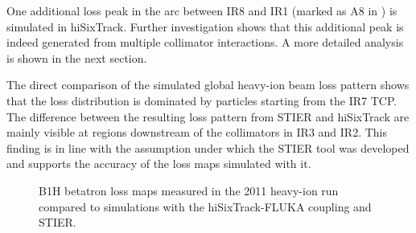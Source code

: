 One additional loss peak in the arc between IR8 and IR1 (marked as A8 in ) is simulated in hiSixTrack. Further investigation shows that this additional peak is indeed generated from multiple collimator interactions. A more detailed analysis is shown in the next section.


The direct comparison of the simulated global heavy-ion beam loss pattern shows that the loss distribution is dominated by particles starting from the IR7 TCP. The difference between the resulting loss pattern from STIER and hiSixTrack are mainly visible at regions downstream of the collimators in IR3 and IR2. This finding is in line with the assumption under which the STIER tool was developed and supports the accuracy of the loss maps simulated with it. 





\begin{figure}[t]
  \centering
    \caption{B1H betatron loss maps measured in the 2011 heavy-ion run compared to simulations with the hiSixTrack-FLUKA coupling and STIER.}  
    \label{pic:16042202}
  \end{figure}






